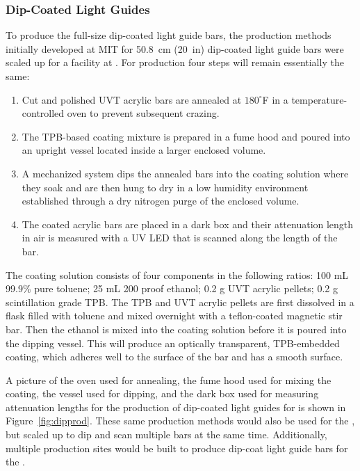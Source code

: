 \subsubsection{Dip-Coated Light Guides}
\label{ssec:fdsp-pd-pc-prod-bar1}

To produce the full-size   dip-coated light guide bars, the production methods initially developed at MIT for \SI{50.8}{cm} (\SI{20}{in}) dip-coated light guide bars were scaled up for a facility at . For  production four steps will remain essentially the same:

\begin{enumerate}
\item Cut and polished UVT acrylic bars are annealed at $180^{\circ}$F in a temperature-controlled oven to prevent subsequent crazing.
\item The TPB-based coating mixture is prepared in a fume hood and poured into an upright vessel located inside a larger enclosed volume.
\item A mechanized system dips the annealed bars into the coating solution where they soak and are then hung to dry in a low humidity environment established through a dry nitrogen purge of the enclosed volume.
\item The coated acrylic bars are placed in a dark box and their attenuation length in air is measured with a UV LED that is scanned along the length of the bar.
\end{enumerate}

The coating solution consists of four components in the following ratios: 100 mL 99.9\% pure toluene; 25 mL 200 proof ethanol; 0.2 g UVT acrylic pellets; 0.2 g scintillation grade TPB. The TPB and UVT acrylic pellets are first dissolved in a flask filled with toluene and mixed overnight with a teflon-coated magnetic stir bar.  Then the ethanol is mixed into the coating solution before it is poured into the dipping vessel.  This will produce an optically transparent, TPB-embedded coating, which adheres well to the surface of the bar and has a smooth surface.

A picture of the oven used for annealing, the fume hood used for mixing the coating, the vessel used for dipping, and the dark box used for measuring attenuation lengths for the production of dip-coated light guides for  is shown in Figure~\ref{fig:dipprod}.  These same production methods would also be used for the  , %
but scaled up to dip and scan multiple bars at the same time.  Additionally, multiple production sites would be built to produce dip-coat light guide bars for the  .

